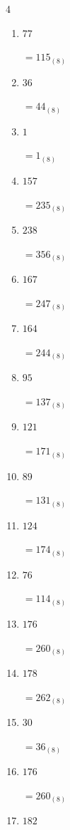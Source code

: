 \begin{multicols}{4}
\begin{enumerate}
  \item $77$

        $=115_{(8)}$

  \item $36$

        $=44_{(8)}$

  \item $1$

        $=1_{(8)}$

  \item $157$

        $=235_{(8)}$

  \item $238$

        $=356_{(8)}$

\columnbreak %

  \item $167$

        $=247_{(8)}$

  \item $164$

        $=244_{(8)}$

  \item $95$

        $=137_{(8)}$

  \item $121$

        $=171_{(8)}$

  \item $89$

        $=131_{(8)}$

  \item $124$

        $=174_{(8)}$

  \item $76$

        $=114_{(8)}$

  \item $176$

        $=260_{(8)}$

  \item $178$

        $=262_{(8)}$

  \item $30$

        $=36_{(8)}$

  \item $176$

        $=260_{(8)}$

  \item $182$


\end{enumerate}
\end{multicols}
